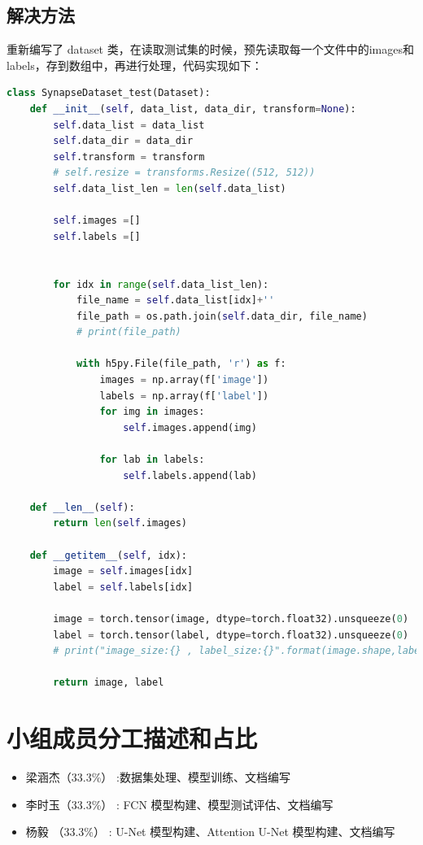 \documentclass[a4paper,12pt]{report}
\begin{document}
\subsection{解决方法}
重新编写了 dataset 类，在读取测试集的时候，预先读取每一个文件中的images和labels，存到数组中，再进行处理，代码实现如下：
\begin{lstlisting}[language=Python]
class SynapseDataset_test(Dataset):
    def __init__(self, data_list, data_dir, transform=None):
        self.data_list = data_list
        self.data_dir = data_dir
        self.transform = transform
        # self.resize = transforms.Resize((512, 512))
        self.data_list_len = len(self.data_list)

        self.images =[]
        self.labels =[]
        

        for idx in range(self.data_list_len):
            file_name = self.data_list[idx]+''
            file_path = os.path.join(self.data_dir, file_name)
            # print(file_path)

            with h5py.File(file_path, 'r') as f:
                images = np.array(f['image'])
                labels = np.array(f['label'])
                for img in images:
                    self.images.append(img)

                for lab in labels:
                    self.labels.append(lab)

    def __len__(self):
        return len(self.images)

    def __getitem__(self, idx):
        image = self.images[idx]
        label = self.labels[idx]

        image = torch.tensor(image, dtype=torch.float32).unsqueeze(0)  # Add channel dimension
        label = torch.tensor(label, dtype=torch.float32).unsqueeze(0) 
        # print("image_size:{} , label_size:{}".format(image.shape,label.shape))
        
        return image, label
\end{lstlisting}


\section{小组成员分工描述和占比}
\begin{itemize}
    \item 梁涵杰（33.3\%） :数据集处理、模型训练、文档编写
    \item 李时玉（33.3\%） : FCN 模型构建、模型测试评估、文档编写
    \item 杨毅  （33.3\%） : U-Net 模型构建、Attention U-Net 模型构建、文档编写
\end{itemize}
\end{document}

